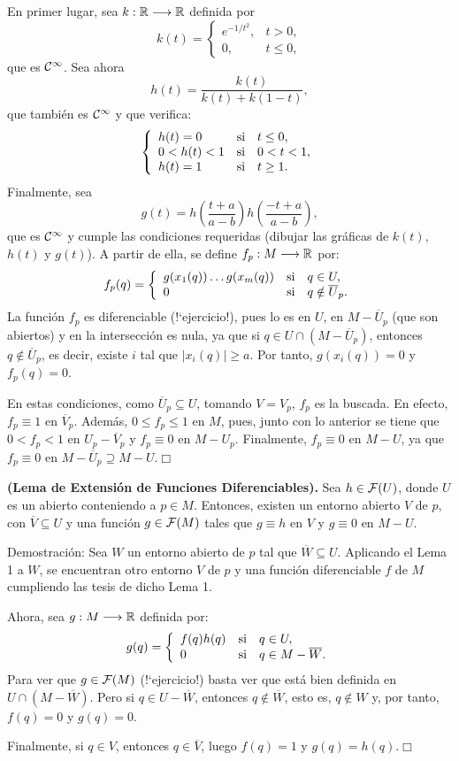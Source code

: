 \documentclass[cursovd_portada.tex]{subfiles}
\begin{document}
\par
En primer lugar, sea $k:\mathbb{R}\longrightarrow \mathbb{R}$ definida por
$$k(t)=\left\{
\begin{array}{lc}
e^{-1/t^2}, & t>0,\\
0, & t\leq 0,
\end{array}
\right.$$ que es ${\cal C}^{\infty}$. Sea ahora
$$h(t)=\frac{k(t)}{k(t)+k(1-t)},$$
que también es ${\cal C}^{\infty}$ y que verifica:
$$\left\{
\begin{array}{lll}
h(t)=0 & {\rm si} & t\leq 0,\\
0<h(t)<1 & {\rm si} & 0<t<1,\\
h(t)=1 & {\rm si} & t\geq 1.
\end{array}
\right.$$
Finalmente, sea
$$g(t)=h(\frac{t+a}{a-b})h(\frac{-t+a}{a-b}),$$
que es ${\cal C}^{\infty}$ y cumple las condiciones requeridas (dibujar las gráficas de $k(t)$, $h(t)$ y $g(t)$).
A partir de ella, se define $f_p:M\longrightarrow\mathbb{R}$ por:
$$f_p(q)=\left\{
\begin{array}{lll}
g(x_1(q))\dots g(x_m(q)) & {\rm si} & q\in U,\\
0 & {\rm si} & q\notin \overline{U}_p.
\end{array}
\right.$$ \hs La función $f_p$ es diferenciable (!`ejercicio!), pues lo es en $U$, en $M-\overline{U}_p$ (que son
abiertos) y en la intersección es nula, ya que si $q\in U\cap (M-\overline{U}_p)$, entonces
$q\notin\overline{U}_p$, es decir, existe $i$ tal que $\vert x_i(q)\vert\geq a$. Por tanto, $g(x_i(q))=0$ y
$f_p(q)=0$.
\par
En estas condiciones, como $\overline{U}_p\subseteq U$, tomando $V=V_p$, $f_p$ es la buscada. En efecto,
$f_p\equiv 1$ en $\overline{V}_p$. Además, $0\leq f_p\leq 1$ en $M$, pues, junto con lo anterior se tiene que
$0<f_p<1$ en $U_p-\overline{V}_p$ y $f_p\equiv 0$ en $M-U_p$. Finalmente, $f_p\equiv 0$ en $M-U$, ya que
$f_p\equiv 0$ en $M-\overline{U}_p\supseteq M-U$.\hfill $\Box$
\begin{teoap}
{\bf (Lema de Extensión de Funciones Diferenciables).} Sea $h\in{\cal F}(U)$, donde $U$ es un abierto conteniendo
a $p\in M$. Entonces, existen un entorno abierto $V$ de $p$, con $\overline{V}\subseteq U$ y una función
$g\in{\cal F}(M)$ tales que $g\equiv h$ en $V$ y $g\equiv 0$ en $M-U$.
\end{teoap}
{\sc Demostración:} Sea $W$ un entorno abierto de $p$ tal que $\overline{W} \subseteq U$. Aplicando el Lema 1 a
$W$, se encuentran otro entorno $V$ de $p$ y una función diferenciable $f$ de $M$ cumpliendo las tesis de dicho
Lema 1.
\par
Ahora, sea $g:M\longrightarrow\mathbb{R}$ definida por:
$$g(q)=\left\{
\begin{array}{lll}
f(q)h(q) & {\rm si} & q\in U,\\
0 & {\rm si} & q\in M-\overline{W}.
\end{array}
\right.$$ \hs Para ver que $g\in{\cal F}(M)$ (!`ejercicio!) basta ver que está bien definida en $U\cap
(M-\overline{W})$. Pero si $q\in U-\overline{W}$, entonces $q\notin\overline{W}$, esto es, $q\notin W$ y, por
tanto, $f(q)=0$ y $g(q)=0$.
\par
Finalmente, si $q\in V$, entonces $q\in\overline{V}$, luego $f(q)=1$ y $g(q)=h(q)$.\hfill $\Box$
\end{document}
